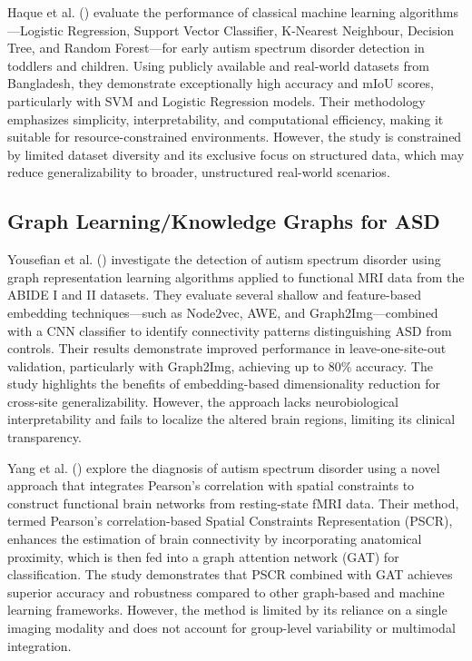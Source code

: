 \documentclass[pdflatex,sn-basic]{sn-jnl}%
\theoremstyle{thmstyleone}%
\theoremstyle{thmstyletwo}%
\theoremstyle{thmstylethree}%
\begin{document}
  Haque et al. (\cite{haque_exploration_2025}) evaluate the performance of classical machine learning algorithms—Logistic
  Regression, Support Vector Classifier, K-Nearest Neighbour, Decision Tree, and Random Forest—for early autism spectrum disorder
  detection in toddlers and children. Using publicly available and real-world datasets from Bangladesh, they demonstrate
  exceptionally high accuracy and mIoU scores, particularly with SVM and Logistic Regression models. Their methodology emphasizes
  simplicity, interpretability, and computational efficiency, making it suitable for resource-constrained environments. However,
  the study is constrained by limited dataset diversity and its exclusive focus on structured data, which may reduce
  generalizability to broader, unstructured real-world scenarios.

  \subsection{Graph Learning/Knowledge Graphs for ASD}

  Yousefian et al. (\cite{yousefian_detection_2023}) investigate the detection of autism spectrum disorder using graph
  representation learning algorithms applied to functional MRI data from the ABIDE I and II datasets. They evaluate several
  shallow and feature-based embedding techniques—such as Node2vec, AWE, and Graph2Img—combined with a CNN classifier to identify
  connectivity patterns distinguishing ASD from controls. Their results demonstrate improved performance in leave-one-site-out
  validation, particularly with Graph2Img, achieving up to 80\% accuracy. The study highlights the benefits of embedding-based
  dimensionality reduction for cross-site generalizability. However, the approach lacks neurobiological interpretability and
  fails to localize the altered brain regions, limiting its clinical transparency.

  Yang et al. (\cite{yang_autism_2021}) explore the diagnosis of autism spectrum disorder using a novel approach that integrates
  Pearson’s correlation with spatial constraints to construct functional brain networks from resting-state fMRI data. Their
  method, termed Pearson’s correlation-based Spatial Constraints Representation (PSCR), enhances the estimation of brain
  connectivity by incorporating anatomical proximity, which is then fed into a graph attention network (GAT) for classification.
  The study demonstrates that PSCR combined with GAT achieves superior accuracy and robustness compared to other graph-based and
  machine learning frameworks. However, the method is limited by its reliance on a single imaging modality and does not account
  for group-level variability or multimodal integration.
\end{document}
